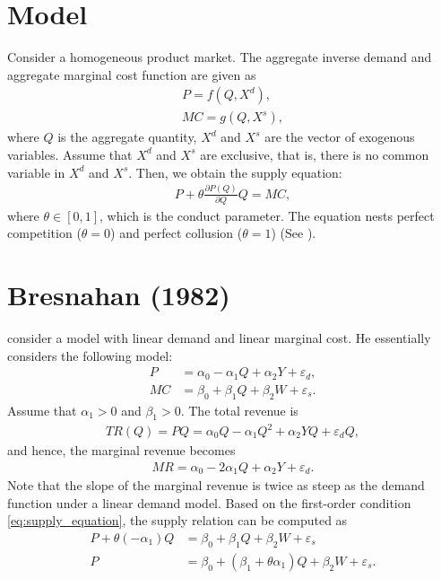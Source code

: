 \documentclass[11pt, a4paper]{article}
\theoremstyle{remark}
\begin{document}
\section{Model}
Consider a homogeneous product market.
The aggregate inverse demand and aggregate marginal cost function are given as
\begin{align}
    P = f(Q, X^{d}), \label{eq:demand}
    \\
    MC = g(Q, X^{s}),\label{eq:marginal_cost}
\end{align}
where $Q$ is the aggregate quantity, $X^{d}$ and $X^{s}$ are the vector of exogenous variables.
Assume that $X^{d}$ and $X^{s}$ are exclusive, that is, there is no common variable in $X^{d}$ and $X^{s}$.
Then, we obtain the supply equation:
\begin{align}
     P + \theta\frac{\partial P(Q)}{\partial Q}Q = MC,\label{eq:supply_equation}
\end{align}
where $\theta\in[0,1]$, which is the conduct parameter. The equation nests perfect competition ($\theta=0$) and perfect collusion ($\theta=1$) (See \cite{bresnahan1982oligopoly}). 



\section{Bresnahan (1982)}
\citet{bresnahan1982oligopoly} consider a model with linear demand and linear marginal cost.
He essentially considers the following model:
\begin{align}
    P & = \alpha_0 - \alpha_1 Q + \alpha_2 Y + \varepsilon_d,\label{eq:bresnahan_demand} \\
    MC & = \beta_0 + \beta_1 Q + \beta_2 W + \varepsilon_s. \label{eq:bresnahan_marginal_cost}
\end{align}
Assume that $\alpha_1>0$ and $\beta_1 >0$.
The total revenue is 
\begin{align}
    TR(Q) = PQ = \alpha_0Q - \alpha_1 Q^2 + \alpha_2 YQ + \varepsilon_d Q,
\end{align}
and hence, the marginal revenue becomes
\begin{align}
    MR = \alpha_0 - 2\alpha_1 Q + \alpha_2 Y + \varepsilon_d. \label{eq:bresnahan_marginal_revenue}
\end{align}
Note that the slope of the marginal revenue is twice as steep as the demand function under a linear demand model.
Based on the first-order condition \eqref{eq:supply_equation}, the supply relation can be computed as
\begin{align}
    P + \theta (-\alpha_1) Q & = \beta_0 + \beta_1 Q  + \beta_2 W + \varepsilon_s\\
   P & = \beta_0 + (\beta_1 + \theta\alpha_1) Q  + \beta_2 W + \varepsilon_s.\label{eq:bresnahan_supply}
\end{align}
\end{document}

